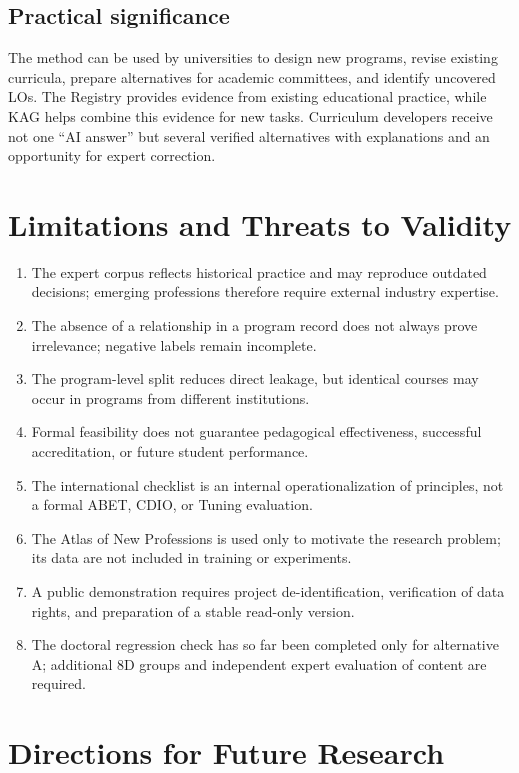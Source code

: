 \documentclass[twoside,11pt]{article}
\begin{document}
\subsection{Practical significance}

The method can be used by universities to design new programs, revise existing curricula, prepare alternatives for academic committees, and identify uncovered LOs. The Registry provides evidence from existing educational practice, while KAG helps combine this evidence for new tasks. Curriculum developers receive not one ``AI answer'' but several verified alternatives with explanations and an opportunity for expert correction.

\section{Limitations and Threats to Validity}

\begin{enumerate}
  \item The expert corpus reflects historical practice and may reproduce outdated decisions; emerging professions therefore require external industry expertise.
  \item The absence of a relationship in a program record does not always prove irrelevance; negative labels remain incomplete.
  \item The program-level split reduces direct leakage, but identical courses may occur in programs from different institutions.
  \item Formal feasibility does not guarantee pedagogical effectiveness, successful accreditation, or future student performance.
  \item The international checklist is an internal operationalization of principles, not a formal ABET, CDIO, or Tuning evaluation.
  \item The Atlas of New Professions is used only to motivate the research problem; its data are not included in training or experiments.
  \item A public demonstration requires project de-identification, verification of data rights, and preparation of a stable read-only version.
  \item The doctoral regression check has so far been completed only for alternative A; additional 8D groups and independent expert evaluation of content are required.
\end{enumerate}

\section{Directions for Future Research}
\end{document}
